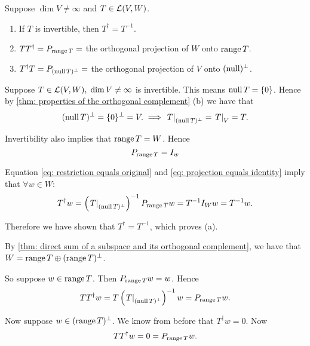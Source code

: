 \begin{thm} 
  \label{thm: algebraic properties of the pseudoinverse}
  Suppose $\dim V \neq \infty$ and $T\in \mathcal{L}(V,W)$.
  \begin{enumerate}[label=(\alph*)]
    \item If $T$ is invertible, then $T^\dagger = T^{-1}$.
    \item $T T^\dagger = P_{\operatorname{range} T} =$ the orthogonal projection of $W$ onto $\operatorname{range} T$.
    \item $T^\dagger T = P_{(\operatorname{null} T)^\bot} =$ the orthogonal projection of $V$ onto $(\operatorname{null})^\bot$.
  \end{enumerate}
\end{thm}
\begin{prf}
  Suppose $T \in \mathcal{L}(V,W), \; \dim V \neq \infty$ is invertible. This means $\operatorname{null} T = \{0\}$. Hence by \ref{thm: properties of the orthogonal complement} (b) we have that
  \begin{equation}
      \label{eq: restriction equals original}
      (\operatorname{null} T)^\bot = \{0\}^\bot = V. \implies \left. T \right |_{(\operatorname{null} T)^\bot} = \left. T \right|_V= T.
  \end{equation}

  Invertibility also implies that $\operatorname{range} T = W$. Hence
  \begin{equation}
    \label{eq: projection equals identity}
    P_{\operatorname{range} T} = I_w
  \end{equation}


  Equation \eqref{eq: restriction equals original} and \eqref{eq: projection equals identity} imply that $\forall w \in W:$
  \[
    T^\dagger w = \left( \left. T \right|_{(\operatorname{null} T)^\bot} \right)^{-1} P_{\operatorname{range} T} w = T^{-1} I_W w = T^{-1} w.
  \]

  Therefore we have shown that $T^\dagger = T^{-1}$, which proves (a).

   By \eqref{thm: direct sum of a subspace and its orthogonal complement}, we have that $W= \operatorname{range} T \oplus (\operatorname{range} T)^\bot$.

  So suppose $w \in \operatorname{range} T$. Then $P_{\operatorname{range} T} w=w$. Hence
  \[
    T T^\dagger w = T \left( \left. T \right|_{(\operatorname{null} T)^\bot} \right)^{-1} w = P_{\operatorname{range} T} w.
  \]

  Now suppose $w \in (\operatorname{range} T)^\bot$. We know from before that $T^\dagger w = 0$. Now
  \[
    T T^\dagger w = 0 = P_{\operatorname{range} T} w.
  \]


\end{prf}
